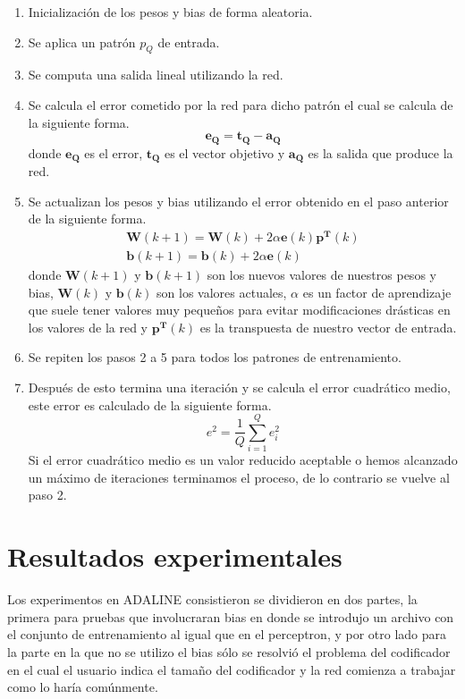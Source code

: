 \documentclass[12pt, titlepage]{article}
\begin{document}
    \begin{enumerate}
        \item Inicialización de los pesos y bias de forma aleatoria.
        \item Se aplica un patrón $p_Q$ de entrada.
        \item Se computa una salida lineal utilizando la red.
        \item Se calcula el error cometido por la red para dicho patrón el cual se calcula de la siguiente forma.
        \[\boldsymbol{e_Q = t_Q - a_Q} \]
        donde $\boldsymbol{e_Q}$ es el error, $\boldsymbol{t_Q}$ es el vector objetivo y $\boldsymbol{a_Q}$ es la salida que produce la red.
        \item Se actualizan los pesos y bias utilizando el error obtenido en el paso anterior de la siguiente forma.
        \begin{gather*}
        \boldsymbol{W}(k+1) = \boldsymbol{W}(k) +2\alpha \boldsymbol{e}(k)\boldsymbol{p^T}(k) \\
        \boldsymbol{b}(k+1) =\boldsymbol{b}(k) + 2\alpha \boldsymbol{e}(k)
        \end{gather*}
        donde $\boldsymbol{W}(k+1)$ y $\boldsymbol{b}(k+1)$ son los nuevos valores de nuestros pesos y bias, $\boldsymbol{W}(k)$ y $\boldsymbol{b}(k)$ son los valores actuales, $\alpha$ es un factor de aprendizaje que suele tener valores muy pequeños para evitar modificaciones drásticas en los valores de la red y $\boldsymbol{p^T}(k)$ es la transpuesta de nuestro vector de entrada.
        \item Se repiten los pasos 2 a 5 para todos los patrones de entrenamiento.
        \item Después de esto termina una iteración y se calcula el error cuadrático medio, este error es calculado de la siguiente forma.
        \[ e^2 = \frac{1}{Q} \sum _{i=1}^{Q} e^2_i \]
        Si el error cuadrático medio es un valor reducido aceptable o hemos alcanzado un máximo de iteraciones terminamos el proceso, de lo contrario se vuelve al paso 2.
    \end{enumerate}
\newpage
    \section{Resultados experimentales}
    Los experimentos en ADALINE consistieron se dividieron en dos partes, la primera para pruebas que involucraran bias en donde se introdujo un archivo con el conjunto de entrenamiento al igual que en el perceptron, y por otro lado para la parte en la que no se utilizo el bias sólo se resolvió el problema del codificador en el cual el usuario indica el tamaño del codificador y la red comienza a trabajar como lo haría comúnmente.
    
\end{document}
